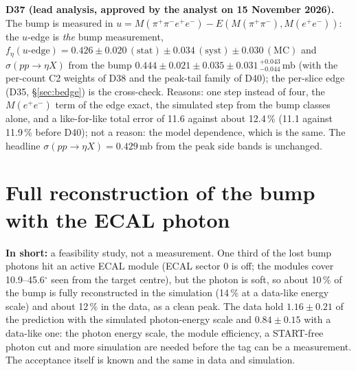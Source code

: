 \documentclass[11pt,a4paper]{article}
\newcommand{\Mfour}{\ensuremath{M(\pi^{+}\pi^{-}e^{+}e^{-})}\xspace}
\newcommand{\Mee}{\ensuremath{M(e^{+}e^{-})}\xspace}
\newcommand{\Mpipi}{\ensuremath{M(\pi^{+}\pi^{-})}\xspace}
\newcommand{\sigeta}{\ensuremath{\sigma(pp\to\eta X)}\xspace}
\newcommand{\notebox}[1]{\par\noindent\colorbox{orange!10}{\parbox{\dimexpr\linewidth-2\fboxsep\relax}{#1}}\par}
\newcommand{\tipbox}[1]{\par\noindent\colorbox{blue!6}{\parbox{\dimexpr\linewidth-2\fboxsep\relax}{#1}}\par}
\newcommand{\inshort}[1]{\tipbox{\textbf{In short:} #1}}%
\begin{document}
\notebox{\textbf{D37 (lead analysis, approved by the analyst on 15 November 2026).} The bump is measured in $u=\Mfour-E(\Mpipi,\Mee)$: the
$u$-edge is \emph{the} bump measurement, $f_\eta(u\text{-edge})=0.426\pm0.020\,(\mathrm{stat})\pm0.034\,(\mathrm{syst})\pm0.030\,(\mathrm{MC})$ and
\sigeta from the bump $0.444\pm0.021\pm0.035\pm0.031\,^{+0.043}_{-0.044}$\,mb (with the per-count C2 weights of D38 and the peak-tail family of D40);
the per-slice edge (D35, \S\ref{sec:bedge}) is the cross-check. Reasons: one step instead of four, the \Mee term of the edge exact, the simulated
step from the bump classes alone, and a like-for-like total error of 11.6 against about 12.4\,\% (11.1 against 11.9\,\% before D40); not a reason:
the model dependence, which is the same. The headline \sigeta $=0.429$\,mb from the peak side bands is
unchanged.}

\section{Full reconstruction of the bump with the ECAL photon}
\label{sec:ecalacc}
\inshort{a feasibility study, not a measurement. One third of the lost bump photons hit an active ECAL module (ECAL sector 0 is off; the
modules cover 10.9--45.6$^\circ$ seen from the target centre), but the photon is soft, so about 10\,\% of the bump is fully reconstructed in the
simulation (14\,\% at a data-like energy scale) and about 12\,\% in the data, as a clean peak. The data hold $1.16\pm0.21$ of the prediction with
the simulated photon-energy scale and $0.84\pm0.15$ with a data-like one: the photon energy scale, the module efficiency, a START-free photon cut
and more simulation are needed before the tag can be a measurement. The acceptance itself is known and the same in data and simulation.}
\end{document}
